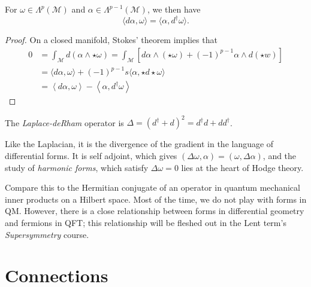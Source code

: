 \begin{claim}
  For $\omega \in \Lambda^p(\mathcal{M})$ and $\alpha \in \Lambda^{p-1}(\mathcal{M})$, we then have
  \begin{equation}
    \langle d\alpha, \omega \rangle = \langle \alpha, d^{\dagger}\omega \rangle.
  \end{equation}
\end{claim}
\begin{proof}
  On a closed manifold, Stokes' theorem implies that
  \begin{align}
    0 &= \int_{\mathcal{M}} d(\alpha \wedge \star\omega) = \int_{\mathcal{M}} \left[ d\alpha \wedge (\star \omega) + (-1)^{p-1} \alpha \wedge d(\star w) \right]   \\
      &= \langle d\alpha, \omega\rangle 
      + (-1)^{p-1} s \langle \alpha, \star d\star\omega \rangle \\
      &= \left\langle d \alpha, \omega \right\rangle - \left\langle \alpha, d^{\dagger} \omega \right\rangle
  \end{align}
\end{proof}

\begin{definition}[]
  The \emph{Laplace-deRham} operator is $\Delta = (d^{\dagger} + d)^2 = d^{\dagger} d + d d^{\dagger}$.
\end{definition}
Like the Laplacian, it is the divergence of the gradient in the language of differential forms. It is self adjoint, which gives $(\Delta \omega, \alpha) = (\omega, \Delta \alpha)$, and the study of \emph{harmonic forms}, which satisfy $\Delta \omega = 0 $ lies at the heart of Hodge theory.

\begin{leftbar}
  \begin{remark}
    Compare this to the Hermitian conjugate of an operator in quantum mechanical inner products on a Hilbert space. Most of the time, we do not play with forms in QM.
    However, there is a close relationship between forms in differential geometry and fermions in QFT; this relationship will be fleshed out in the Lent term's \emph{Supersymmetry} course.
  \end{remark}
\end{leftbar}

\section{Connections}%
\label{sec:connections_and_curvature}

